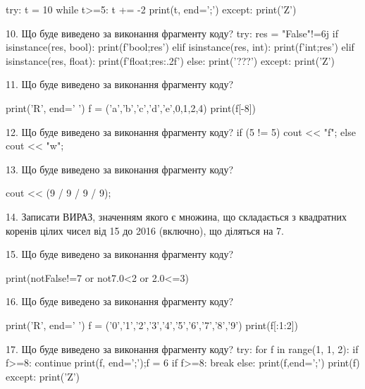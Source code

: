 \documentclass[11pt]{article}
\begin{document}
try:
    t = 10
    while t>=5:
        t += -2
    print(t, end=';')
except:
    print('Z')

\vspace{5mm}

10. Що буде виведено за виконання фрагменту коду?
try:
    res = "False"!=6j
    if isinstance(res, bool):
        print(f'bool;{res}')
    elif isinstance(res, int):
        print(f'int;{res}')
    elif isinstance(res, float):
        print(f'float;{res:.2f}')
    else:
        print('???')
except:
    print('Z')
\vspace{5mm}

11. Що буде виведено за виконання фрагменту коду?

print('R', end=' ')
f = ('a','b','c','d','e',0,1,2,4)
print(f[-8])

\vspace{5mm}

12. Що буде виведено за виконання фрагменту коду?
if (5 != 5)
    cout << "f";
else
    cout << "w";

\vspace{5mm}

13. Що буде виведено за виконання фрагменту коду?

cout << (9 / 9 / 9 / 9);
\vspace{5mm}

14. 
Записати ВИРАЗ, значенням якого є множина, що складається з квадратних коренів цілих чисел від 15 до 2016 (включно), що діляться на 7.\vspace{5mm}

15. Що буде виведено за виконання фрагменту коду?

print(notFalse!=7 or not7.0<2 or 2.0<=3)
\vspace{5mm}

16. Що буде виведено за виконання фрагменту коду?

print('R', end=' ')
f = ('0','1','2','3','4','5','6','7','8','9')
print(f[:1:2])

\vspace{5mm}

17. Що буде виведено за виконання фрагменту коду?
try:
    for f in range(1, 1, 2):
        if f>=8:
            continue
        print(f, end=';');f = 6
        if f>=8:
            break
    else:
        print(f,end=';')
    print(f)
except:
    print('Z')
\vspace{5mm}
\end{document}
